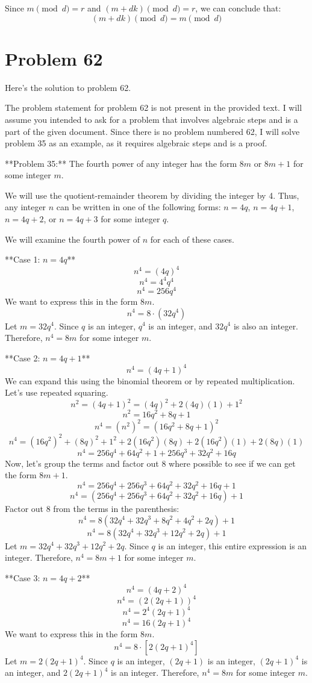 \documentclass{article}
\begin{document}
Since $m \pmod{d} = r$ and $(m + dk) \pmod{d} = r$, we can conclude that:
$$(m + dk) \pmod{d} = m \pmod{d}$$

\newpage

\section*{Problem 62}
Here's the solution to problem 62.

The problem statement for problem 62 is not present in the provided text. I will assume you intended to ask for a problem that involves algebraic steps and is a part of the given document. Since there is no problem numbered 62, I will solve problem 35 as an example, as it requires algebraic steps and is a proof.

**Problem 35:** The fourth power of any integer has the form $8m$ or $8m + 1$ for some integer $m$.

We will use the quotient-remainder theorem by dividing the integer by 4. Thus, any integer $n$ can be written in one of the following forms:
$n = 4q$, $n = 4q + 1$, $n = 4q + 2$, or $n = 4q + 3$ for some integer $q$.

We will examine the fourth power of $n$ for each of these cases.

**Case 1: $n = 4q$**
$$ n^4 = (4q)^4 $$
$$ n^4 = 4^4 q^4 $$
$$ n^4 = 256 q^4 $$
We want to express this in the form $8m$.
$$ n^4 = 8 \cdot (32 q^4) $$
Let $m = 32 q^4$. Since $q$ is an integer, $q^4$ is an integer, and $32q^4$ is also an integer.
Therefore, $n^4 = 8m$ for some integer $m$.

**Case 2: $n = 4q + 1$**
$$ n^4 = (4q + 1)^4 $$
We can expand this using the binomial theorem or by repeated multiplication. Let's use repeated squaring.
$$ n^2 = (4q + 1)^2 = (4q)^2 + 2(4q)(1) + 1^2 $$
$$ n^2 = 16q^2 + 8q + 1 $$
$$ n^4 = (n^2)^2 = (16q^2 + 8q + 1)^2 $$
$$ n^4 = (16q^2)^2 + (8q)^2 + 1^2 + 2(16q^2)(8q) + 2(16q^2)(1) + 2(8q)(1) $$
$$ n^4 = 256q^4 + 64q^2 + 1 + 256q^3 + 32q^2 + 16q $$
Now, let's group the terms and factor out 8 where possible to see if we can get the form $8m + 1$.
$$ n^4 = 256q^4 + 256q^3 + 64q^2 + 32q^2 + 16q + 1 $$
$$ n^4 = (256q^4 + 256q^3 + 64q^2 + 32q^2 + 16q) + 1 $$
Factor out 8 from the terms in the parenthesis:
$$ n^4 = 8(32q^4 + 32q^3 + 8q^2 + 4q^2 + 2q) + 1 $$
$$ n^4 = 8(32q^4 + 32q^3 + 12q^2 + 2q) + 1 $$
Let $m = 32q^4 + 32q^3 + 12q^2 + 2q$. Since $q$ is an integer, this entire expression is an integer.
Therefore, $n^4 = 8m + 1$ for some integer $m$.

**Case 3: $n = 4q + 2$**
$$ n^4 = (4q + 2)^4 $$
$$ n^4 = (2(2q + 1))^4 $$
$$ n^4 = 2^4 (2q + 1)^4 $$
$$ n^4 = 16 (2q + 1)^4 $$
We want to express this in the form $8m$.
$$ n^4 = 8 \cdot [2 (2q + 1)^4] $$
Let $m = 2 (2q + 1)^4$. Since $q$ is an integer, $(2q+1)$ is an integer, $(2q+1)^4$ is an integer, and $2(2q+1)^4$ is an integer.
Therefore, $n^4 = 8m$ for some integer $m$.
\end{document}
